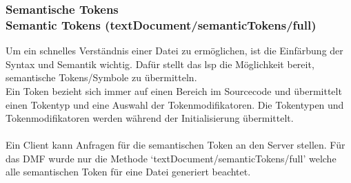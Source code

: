 \documentclass[./einleitung.tex]{subfiles}
\begin{document}
    \subsubsection[Semantische Tokens]{Semantische Tokens\\ {\textnormal{\footnotesize Semantic Tokens (textDocument/semanticTokens/full) \cite{semantic}}}}\label{subsubsec:semantic}
    Um ein schnelles Verständnis einer Datei zu ermöglichen, ist die Einfärbung der Syntax und Semantik wichtig.
    Dafür stellt das \acrshort{lsp} die Möglichkeit bereit, semantische Tokens/Symbole zu übermitteln.\\
    Ein Token bezieht sich immer auf einen Bereich im Sourcecode und übermittelt einen Tokentyp und eine Auswahl der Tokenmodifikatoren.
    Die Tokentypen und Tokenmodifikatoren werden während der Initialisierung übermittelt.
    \\\\
    Ein Client kann Anfragen für die semantischen Token an den Server stellen.
    Für das DMF wurde nur die Methode `textDocument/semanticTokens/full' welche alle semantischen Token für eine Datei generiert beachtet.
\end{document}
